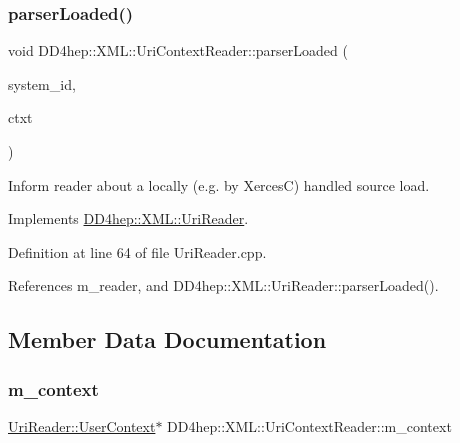 \subsubsection{\texorpdfstring{parser\+Loaded()}{parserLoaded()}\hspace{0.1cm}{\footnotesize\ttfamily [2/2]}}
{\footnotesize\ttfamily void D\+D4hep\+::\+X\+M\+L\+::\+Uri\+Context\+Reader\+::parser\+Loaded (\begin{DoxyParamCaption}\item[{const std\+::string \&}]{system\+\_\+id,  }\item[{\hyperlink{struct_d_d4hep_1_1_x_m_l_1_1_uri_reader_1_1_user_context}{User\+Context} $\ast$}]{ctxt }\end{DoxyParamCaption})\hspace{0.3cm}{\ttfamily [virtual]}}



Inform reader about a locally (e.\+g. by XercesC) handled source load. 



Implements \hyperlink{class_d_d4hep_1_1_x_m_l_1_1_uri_reader_ad04589fb5da7fe238c1a0cf1c8e4f0ac}{D\+D4hep\+::\+X\+M\+L\+::\+Uri\+Reader}.



Definition at line 64 of file Uri\+Reader.\+cpp.



References m\+\_\+reader, and D\+D4hep\+::\+X\+M\+L\+::\+Uri\+Reader\+::parser\+Loaded().



\subsection{Member Data Documentation}
\hypertarget{class_d_d4hep_1_1_x_m_l_1_1_uri_context_reader_ac95a39733d67430a8faa6427f750e448}{}\label{class_d_d4hep_1_1_x_m_l_1_1_uri_context_reader_ac95a39733d67430a8faa6427f750e448} 
\subsubsection{\texorpdfstring{m\+\_\+context}{m\_context}}
{\footnotesize\ttfamily \hyperlink{struct_d_d4hep_1_1_x_m_l_1_1_uri_reader_1_1_user_context}{Uri\+Reader\+::\+User\+Context}$\ast$ D\+D4hep\+::\+X\+M\+L\+::\+Uri\+Context\+Reader\+::m\+\_\+context\hspace{0.3cm}{\ttfamily [protected]}}



